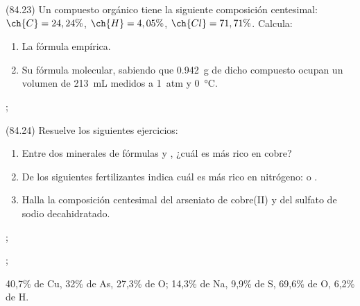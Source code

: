 \documentclass[10pt,a5paper,twoside]{article}
\begin{document}
  \begin{exercise}[
      tags    = {},
      topics  = {química,química básica},
      source  = {FQ 1B MGH 2016, p84, e23},
    ]
    (84.23) Un compuesto orgánico tiene la siguiente composición centesimal: \( \ch{C} = 24,24\% \), \( \ch{H} = 4,05\% \), \( \ch{Cl} = 71,71\% \). Calcula: %
    \begin{enumerate}
      \item La fórmula empírica.
      \item Su fórmula molecular, sabiendo que \SI{0.942}{\gram} de dicho compuesto ocupan un volumen de \SI{213}{\milli\liter} medidos a \SI{1}{atm} y \SI{0}{\celsius}.
    \end{enumerate}
  \end{exercise}

  \begin{solution}
    \begin{enumerate*}
      \item {};
      \item {}
    \end{enumerate*}
  \end{solution}




  \begin{exercise}[
      tags    = {},
      topics  = {química,química básica},
      source  = {FQ 1B MGH 2016, p84, e24},
    ]
    (84.24) Resuelve los siguientes ejercicios:
    \begin{enumerate}
      \item Entre dos minerales de fórmulas  y , ¿cuál es más rico en cobre?
      \item De los siguientes fertilizantes indica cuál es más rico en nitrógeno:  o .
      \item Halla la composición centesimal del arseniato de cobre(II)
      y del sulfato de sodio decahidratado.
    \end{enumerate}
  \end{exercise}

  \begin{solution}
    \begin{enumerate*}
      \item {};
      \item {};
      \item 40,7\% de Cu, 32\% de As, 27,3\% de O; 14,3\% de Na, 9,9\% de S, 69,6\% de O, 6,2\% de H.
    \end{enumerate*}
  \end{solution}
\end{document}
